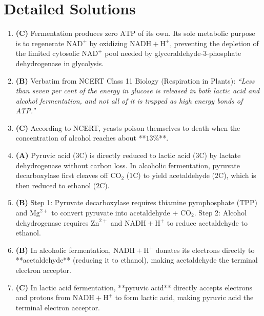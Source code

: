 \documentclass[11pt, a4paper]{article}
\begin{document}
\section*{Detailed Solutions}

\begin{enumerate}[label=\textbf{\arabic*.}]

\item \textbf{(C)} Fermentation produces zero $\text{ATP}$ of its own. Its sole metabolic purpose is to regenerate $\text{NAD}^+$ by oxidizing $\text{NADH} + \text{H}^+$, preventing the depletion of the limited cytosolic $\text{NAD}^+$ pool needed by glyceraldehyde-3-phosphate dehydrogenase in glycolysis.

\item \textbf{(B)} Verbatim from NCERT Class 11 Biology (Respiration in Plants): \textit{``Less than seven per cent of the energy in glucose is released in both lactic acid and alcohol fermentation, and not all of it is trapped as high energy bonds of ATP.''}

\item \textbf{(C)} According to NCERT, yeasts poison themselves to death when the concentration of alcohol reaches about **$13\%$**.

\item \textbf{(A)} Pyruvic acid ($3\text{C}$) is directly reduced to lactic acid ($3\text{C}$) by lactate dehydrogenase without carbon loss. In alcoholic fermentation, pyruvate decarboxylase first cleaves off $\text{CO}_2$ ($1\text{C}$) to yield acetaldehyde ($2\text{C}$), which is then reduced to ethanol ($2\text{C}$).

\item \textbf{(B)} Step 1: Pyruvate decarboxylase requires thiamine pyrophosphate ($\text{TPP}$) and $\text{Mg}^{2+}$ to convert pyruvate into acetaldehyde + $\text{CO}_2$. Step 2: Alcohol dehydrogenase requires $\text{Zn}^{2+}$ and $\text{NADH} + \text{H}^+$ to reduce acetaldehyde to ethanol.

\item \textbf{(B)} In alcoholic fermentation, $\text{NADH} + \text{H}^+$ donates its electrons directly to **acetaldehyde** (reducing it to ethanol), making acetaldehyde the terminal electron acceptor.

\item \textbf{(C)} In lactic acid fermentation, **pyruvic acid** directly accepts electrons and protons from $\text{NADH} + \text{H}^+$ to form lactic acid, making pyruvic acid the terminal electron acceptor.


\end{enumerate}
\end{document}
